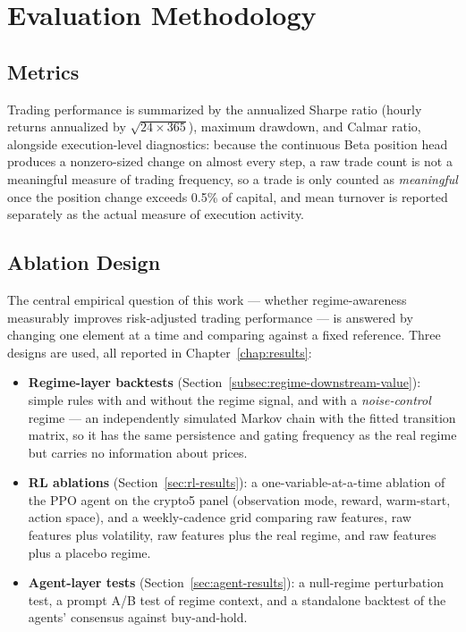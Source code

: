\section{Evaluation Methodology}
\label{sec:evaluation-methodology-full}

\subsection{Metrics}
\label{subsec:eval-metrics}

Trading performance is summarized by the annualized Sharpe ratio \cite{sharpe1966} (hourly returns annualized by $\sqrt{24 \times 365}$), maximum drawdown, and Calmar ratio, alongside execution-level diagnostics: because the continuous Beta position head produces a nonzero-sized change on almost every step, a raw trade count is not a meaningful measure of trading frequency, so a trade is only counted as \emph{meaningful} once the position change exceeds 0.5\% of capital, and mean turnover is reported separately as the actual measure of execution activity.

\subsection{Ablation Design}
\label{subsec:eval-ablation}

The central empirical question of this work --- whether regime-awareness measurably improves risk-adjusted trading performance --- is answered by changing one element at a time and comparing against a fixed reference. Three designs are used, all reported in Chapter~\ref{chap:results}:

\begin{itemize}
    \item \textbf{Regime-layer backtests} (Section~\ref{subsec:regime-downstream-value}): simple rules with and without the regime signal, and with a \emph{noise-control} regime --- an independently simulated Markov chain with the fitted transition matrix, so it has the same persistence and gating frequency as the real regime but carries no information about prices.
    \item \textbf{RL ablations} (Section~\ref{sec:rl-results}): a one-variable-at-a-time ablation of the PPO agent on the crypto5 panel (observation mode, reward, warm-start, action space), and a weekly-cadence grid comparing raw features, raw features plus volatility, raw features plus the real regime, and raw features plus a placebo regime.
    \item \textbf{Agent-layer tests} (Section~\ref{sec:agent-results}): a null-regime perturbation test, a prompt A/B test of regime context, and a standalone backtest of the agents' consensus against buy-and-hold.
\end{itemize}

